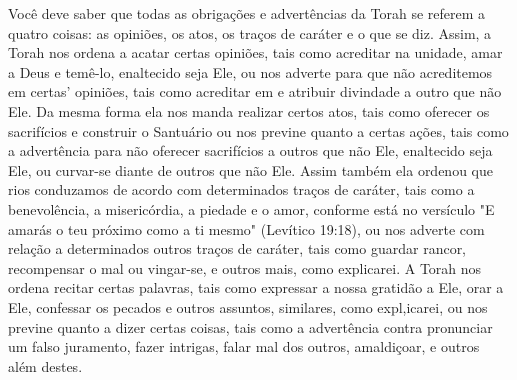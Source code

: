 Você deve saber que todas as obrigações e advertências da Torah se
referem a quatro coisas: as opiniões, os atos, os traços de caráter e o
que se diz. Assim, a Torah nos ordena a acatar certas opiniões, tais
como acreditar na unidade, amar a Deus e temê-lo, enaltecido seja Ele,
ou nos adverte para que não acreditemos em certas' opiniões, tais como
acreditar em e atribuir divinda­de a outro que não Ele. Da mesma forma
ela nos manda realizar certos atos, tais como oferecer os sacrifícios e
construir o Santuário ou nos previne quanto a certas ações, tais como a
advertência para não oferecer sacrifícios a outros que não Ele,
enaltecido seja Ele, ou curvar-se diante de outros que não Ele. As­sim
também ela ordenou que rios conduzamos de acordo com determinados traços
de caráter, tais como a benevolência, a misericórdia, a piedade e o
amor, conforme está no versículo "E amarás o teu próximo como a ti
mesmo" (Leví­tico 19:18), ou nos adverte com relação a determinados
outros traços de cará­ter, tais como guardar rancor, recompensar o mal
ou vingar-se, e outros mais, como explicarei. A Torah nos ordena recitar
certas palavras, tais como expres­sar a nossa gratidão a Ele, orar a
Ele, confessar os pecados e outros assuntos, similares, como 
expl,icarei, ou nos previne quanto a dizer certas
coisas, tais co­mo a advertência contra pronunciar um falso juramento,
fazer intrigas, falar mal dos outros, amaldiçoar, e outros além destes.

